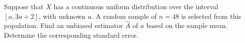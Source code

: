 Suppose that $X$ has a continuous uniform distribution over the interval $[a, 3a + 2]$, with unknown $a$.
A random sample of $n = 48$ is selected from this population.
Find an unbiased estimator $\hat{A}$ of $a$ based on the sample mean.
Determine the corresponding standard error.